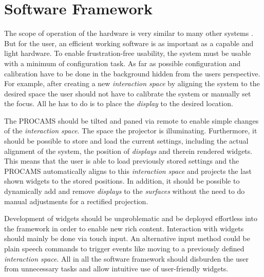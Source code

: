 \section{Software Framework}
The scope of operation of the hardware is very similar to many other systems \cite{Hardy:2012jo,Xiao:2013dp,Wilson:2012fb,Raskar:2005jy}. But for the user, an efficient working software is as important as a capable and light hardware. To enable frustration-free usability, the system must be usable with a minimum of configuration task. As far as possible configuration and calibration have to be done in the background hidden from the users perspective. For example, after creating a new \emph{interaction space} by aligning the system to the desired space the user should not have to calibrate the system or manually set the focus. All he has to do is to place the \emph{display} to the desired location.

The PROCAMS should be tilted and paned via remote to enable simple changes of the \emph{interaction space}. The space the projector is illuminating. Furthermore, it should be possible to store and load the current settings, including the actual alignment of the system, the position of \emph{displays} and therein rendered widgets. This means that the user is able to load previously stored settings and the \ac{PROCAMS} automatically aligns to this \emph{interaction space} and projects the last shown widgets to the stored positions. In addition, it should be possible to dynamically add and remove \emph{displays} to the \emph{surfaces} without the need to do manual adjustments for a rectified projection.

Development of widgets should be unproblematic and be deployed effortless into the framework in order to enable new rich content. Interaction with widgets should mainly be done via touch input. An alternative input method could be plain speech commands to trigger events like moving to a previously defined \emph{interaction space}. All in all the software framework should disburden the user from unnecessary tasks and allow intuitive use of user-friendly widgets.